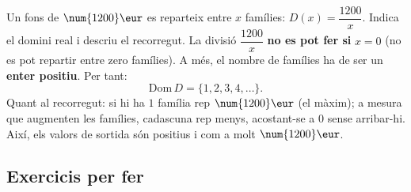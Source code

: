 \begin{exresolt}
Un fons de $\num{1200}\eur$ es reparteix entre $x$ famílies: $D(x)=\dfrac{\num{1200}}{x}$.
Indica el domini real i descriu el recorregut.
\solucio
La divisió $\dfrac{\num{1200}}{x}$ \textbf{no es pot fer si} $x=0$ (no es pot
repartir entre zero famílies). A més, el nombre de famílies ha de ser un
\textbf{enter positiu}. Per tant:
\[
\mathrm{Dom}\,D=\{1,2,3,4,\dots\}.
\]
Quant al recorregut: si hi ha $1$ família rep $\num{1200}\eur$ (el màxim); a mesura
que augmenten les famílies, cadascuna rep menys, acostant-se a $0$ sense arribar-hi.
Així, els valors de sortida són positius i com a molt $\num{1200}\eur$.
\end{exresolt}

\subsection{Exercicis per fer}

